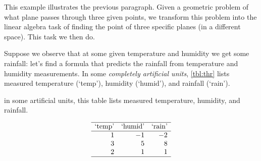 \begin{example} \label{eg:inf3pts}
This example illustrates the previous paragraph.
Given a geometric problem of  what plane passes through three given points, we transform this problem into the linear algebra task of finding the  point of three specific planes (in a different space).
This task we then do.


Suppose we observe that at some given temperature and humidity we get some rainfall: let's find a formula that predicts the rainfall from temperature and humidity measurements.
In some \emph{completely artificial units}, \cref{tbl:thr} lists measured temperature (`temp'), humidity (`humid'), and rainfall (`rain').
\begin{table}
\caption{in some artificial units, this table lists measured temperature, humidity, and rainfall.}
\label{tbl:thr}
\begin{equation*}
\begin{array}{rrr} \hline
\text{`temp'}&\text{`humid'}&\text{`rain'}\\\hline
1&-1&-2\\
3&5&8\\
2&1&1\\\hline
\end{array}
\end{equation*}
\end{table}


\end{example}
